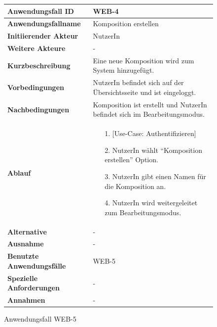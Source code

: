 \begin{figure}[h]
	\centering
	\begin{tabularx}{\textwidth}{ X | X }
		\textbf{Anwendungsfall ID} & WEB-4 \\ \hline
		\textbf{Anwendungsfallname} & Komposition erstellen \\ \hline
		\textbf{Initiierender Akteur} & NutzerIn \\ \hline
		\textbf{Weitere Akteure} & - \\ \hline
		\textbf{Kurzbeschreibung} & Eine neue Komposition wird zum System hinzugefügt. \\ \hline
		\textbf{Vorbedingungen} & NutzerIn befindet sich auf der Übersichtsseite und ist eingeloggt.  \\ \hline
		\textbf{Nachbedingungen} & Komposition ist erstellt und NutzerIn befindet sich im Bearbeitungsmodus. \\ \hline
		\textbf{Ablauf} &
		\begin{enumerate}
			\item[1.]  [Use-Case: Authentifizieren]
			\item[2.]  NutzerIn wählt ``Komposition erstellen'' Option.
			\item[3.]  NutzerIn gibt einen Namen für die Komposition an.
			\item[4.]  NutzerIn wird weitergeleitet zum Bearbeitungsmodus.
		\end{enumerate} \\ \hline
		\textbf{Alternative} & - \\ \hline
		\textbf{Ausnahme} & - \\ \hline
		\textbf{Benutzte Anwendungsfälle} & WEB-5 \\ \hline
		\textbf{Spezielle Anforderungen} & - \\ \hline
		\textbf{Annahmen} & -
	\end{tabularx}
	\caption{Anwendungsfall WEB-5}
	\label{fig:anwendungsfall-server-tabelle-web-4}
\end{figure}

